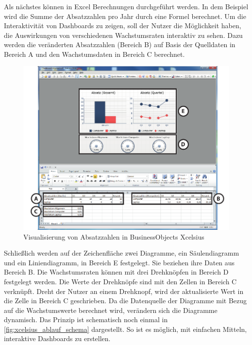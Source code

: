 \begin{onehalfspacing}
Als nächstes können in Excel Berechnungen durchgeführt werden. In dem Beispiel wird die Summe der Absatzzahlen pro Jahr durch eine Formel berechnet. Um die Interaktivität von Dashboards zu zeigen, soll der Nutzer die Möglichkeit haben, die Auswirkungen von verschiedenen Wachstumsraten interaktiv zu sehen. Dazu werden die veränderten Absatzzahlen (Bereich B) auf Basis der Quelldaten in Bereich A und den Wachstumsdaten in Bereich C berechnet.

\begin{figure}[ht]
\centering
\setlength{\unitlength}{1mm}
\includegraphics[width=15cm]{images/Abbildung6-Visualisierung-Absatz-Xcelsius-AI.pdf}
\caption{Visualisierung von Absatzzahlen in BusinessObjects Xcelsius\label{fig:xcelsius_ui_beispiel}}
\end{figure} 

Schließlich werden auf der Zeichenfläche zwei Diagramme, ein Säulendiagramm und ein Liniendiagramm, in Bereich E festgelegt. Sie beziehen ihre Daten aus Bereich B. Die Wachstumsraten können mit drei Drehknöpfen in Bereich D festgelegt werden. Die Werte der Drehknöpfe sind mit den Zellen in Bereich C verknüpft. Dreht der Nutzer an einem Drehknopf, wird der aktualisierte Wert in die Zelle in Bereich C geschrieben. Da die Datenquelle der Diagramme mit Bezug auf die Wachstumswerte berechnet wird, verändern sich die Diagramme dynamisch. Das Prinzip ist schematisch noch einmal in \vref{fig:xcelsius_ablauf_schema} dargestellt. So ist es möglich, mit einfachen Mitteln, interaktive Dashboards zu erstellen.


\end{onehalfspacing}
